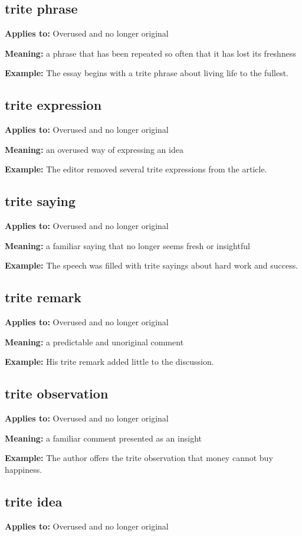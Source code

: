 \documentclass[11pt]{article}
\begin{document}
\subsection{trite phrase}
\textbf{Applies to:} Overused and no longer original

\textbf{Meaning:} a phrase that has been repeated so often that it has lost its freshness

\textbf{Example:} The essay begins with a trite phrase about living life to the fullest.

\subsection{trite expression}
\textbf{Applies to:} Overused and no longer original

\textbf{Meaning:} an overused way of expressing an idea

\textbf{Example:} The editor removed several trite expressions from the article.

\subsection{trite saying}
\textbf{Applies to:} Overused and no longer original

\textbf{Meaning:} a familiar saying that no longer seems fresh or insightful

\textbf{Example:} The speech was filled with trite sayings about hard work and success.

\subsection{trite remark}
\textbf{Applies to:} Overused and no longer original

\textbf{Meaning:} a predictable and unoriginal comment

\textbf{Example:} His trite remark added little to the discussion.

\subsection{trite observation}
\textbf{Applies to:} Overused and no longer original

\textbf{Meaning:} a familiar comment presented as an insight

\textbf{Example:} The author offers the trite observation that money cannot buy happiness.

\subsection{trite idea}
\textbf{Applies to:} Overused and no longer original
\end{document}
